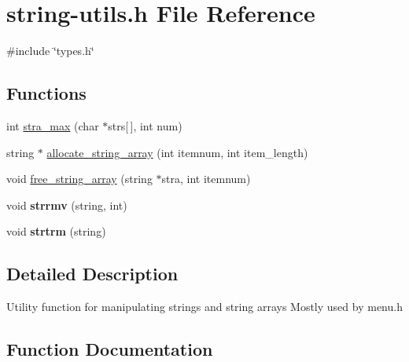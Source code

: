 \hypertarget{string-utils_8h}{}\section{string-\/utils.h File Reference}
\label{string-utils_8h}
{\ttfamily \#include \char`\"{}types.\+h\char`\"{}}\newline
\subsection*{Functions}
\begin{DoxyCompactItemize}
\item 
int \mbox{\hyperlink{string-utils_8h_aebd1ff6ce580eecc97a5953c21bda0c4}{stra\+\_\+max}} (char $\ast$strs\mbox{[}$\,$\mbox{]}, int num)
\item 
string $\ast$ \mbox{\hyperlink{string-utils_8h_a4ee24c0111c7ab27836b907383575124}{allocate\+\_\+string\+\_\+array}} (int itemnum, int item\+\_\+length)
\item 
void \mbox{\hyperlink{string-utils_8h_a918fe39c23de1b58fb8d3cd4749455e3}{free\+\_\+string\+\_\+array}} (string $\ast$stra, int itemnum)
\item 
\mbox{\label{string-utils_8h_a8763d575837b610b705e366611a3bb7c}} 
void {\bfseries strrmv} (string, int)
\item 
\mbox{\label{string-utils_8h_a220db33a8f2f30e9a050c2d0b5a7decd}} 
void {\bfseries strtrm} (string)
\end{DoxyCompactItemize}


\subsection{Detailed Description}
Utility function for manipulating strings and string arrays Mostly used by menu.\+h 

\subsection{Function Documentation}
\mbox{\label{string-utils_8h_a4ee24c0111c7ab27836b907383575124}} 
